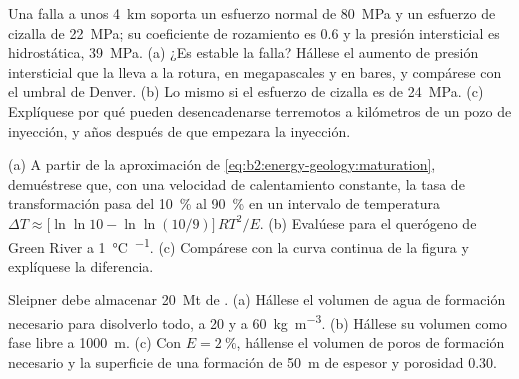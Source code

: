 \begin{exercise}[$\star\star\star$]\label{exo:b2:energy-geology:10}
Una falla a unos \qty{4}{km} soporta un esfuerzo normal de \qty{80}{MPa} y un esfuerzo de cizalla de
\qty{22}{MPa}; su coeficiente de rozamiento es 0.6 y la presión intersticial es hidrostática,
\qty{39}{MPa}. (a) ¿Es estable la falla? Hállese el aumento de presión intersticial que la lleva a la rotura, en
megapascales y en bares, y compárese con el umbral de Denver. (b) Lo mismo si el esfuerzo de cizalla es de
\qty{24}{MPa}. (c) Explíquese por qué pueden desencadenarse terremotos a kilómetros de un pozo de inyección,
y años después de que empezara la inyección.
\end{exercise}

\begin{exercise}[$\star\star\star$]\label{exo:b2:energy-geology:11}
(a) A partir de la aproximación de \eqref{eq:b2:energy-geology:maturation}, demuéstrese que, con una velocidad de
calentamiento constante, la tasa de transformación pasa del \qty{10}{\percent} al \qty{90}{\percent} en un
intervalo de temperatura $\Delta T \approx \bigl[\ln\ln 10 - \ln\ln(10/9)\bigr]\,RT^2/E$. (b) Evalúese
para el querógeno de Green River a \qty{1}{\celsius\per\Myr}. (c) Compárese con la curva continua de la
figura y explíquese la diferencia.
\end{exercise}

\begin{exercise}[$\star\star\star$]\label{exo:b2:energy-geology:12}
Sleipner debe almacenar \qty{20}{Mt} de . (a) Hállese el volumen de agua de formación necesario para
disolverlo todo, a 20 y a \qty{60}{kg.m^{-3}}. (b) Hállese su volumen como fase libre a
\qty{1000}{m}. (c) Con $E = \qty{2}{\percent}$, hállense el volumen de poros de formación necesario y
la superficie de una formación de \qty{50}{m} de espesor y porosidad 0.30.
\end{exercise}


